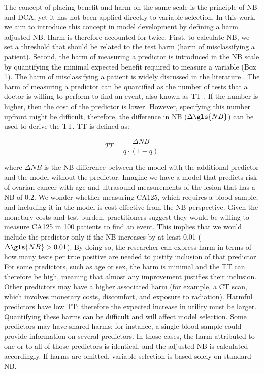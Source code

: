 The concept of placing benefit and harm on the same scale is the principle of \gls{NB} and \gls{DCA}, yet it has not been applied directly to variable selection. In this work, we aim to introduce this concept in model development by defining a harm adjusted \gls{NB}. Harm is therefore accounted for twice. First, to calculate \gls{NB}, we set a threshold that should be related to the test harm (harm of misclassifying a patient). Second, the harm of measuring a predictor is introduced in the \gls{NB} scale by quantifying the minimal expected benefit required to measure a variable (Box 1). The harm of misclassifying a patient is widely discussed in the literature \cite{vickersSimpleStepbystepGuide2019,vickersDecisionCurveAnalysis2006}. The harm of measuring a predictor can be quantified as the number of tests that a doctor is willing to perform to find an event, also known as \gls{TT} \cite{vancalsterReportingInterpretingDecision2018}. If the number is higher, then the cost of the predictor is lower. However, specifying this number upfront might be difficult, therefore, the difference in \gls{NB} ($\Delta \gls{NB}$) can be used to derive the \gls{TT}. \gls{TT} is defined as:

\begin{equation}
TT = \frac{\Delta NB}{q \cdot (1-q)}
\end{equation}

where $\Delta NB$ is the \gls{NB} difference between the model with the additional predictor and the model without the predictor. Imagine we have a model that predicts risk of ovarian cancer with age and ultrasound measurements of the lesion that has a \gls{NB} of 0.2. We wonder whether measuring CA125, which requires a blood sample, and including it in the model is cost-effective from the \gls{NB} perspective. Given the monetary costs and test burden, practitioners suggest they would be willing to measure CA125 in 100 patients to find an event. This implies that we would include the predictor only if the \gls{NB} increases by at least 0.01 ($\Delta \gls{NB} > 0.01$). By doing so, the researcher can express harm in terms of how many tests per true positive are needed to justify inclusion of that predictor. For some predictors, such as age or sex, the harm is minimal and the TT can therefore be high, meaning that almost any improvement justifies their inclusion. Other predictors may have a higher associated harm (for example, a CT scan, which involves monetary costs, discomfort, and exposure to radiation). Harmful predictors have low TT; therefore the expected increase in utility must be larger. Quantifying these harms can be difficult and will affect model selection. Some predictors may have shared harms; for instance, a single blood sample could provide information on several predictors. In those cases, the harm attributed to one or to all of those predictors is identical, and the adjusted \gls{NB} is calculated accordingly. If harms are omitted, variable selection is based solely on standard \gls{NB}.

